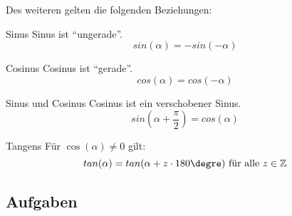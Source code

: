Des weiteren gelten die folgenden Beziehungen:
\begin{gesetz}{Sinus}{}
  Sinus ist ``ungerade''.
  $$sin(\alpha) = - sin(-\alpha)$$
  \end{gesetz}
\begin{gesetz}{Cosinus}{}
  Cosinus ist ``gerade''.
  $$cos(\alpha) = cos(-\alpha)$$
  \end{gesetz}
\begin{gesetz}{Sinus und Cosinus}{}
  Cosinus ist ein verschobener Sinus.
  $$sin\left(\alpha+\frac{\pi}{2}\right) = cos(\alpha)$$
  \end{gesetz}
\begin{gesetz}{Tangens}{}
  Für $\cos(\alpha)\ne 0$ gilt:
  $$tan(\alpha) = tan(\alpha + z\cdot{}180\degre) \textrm{ für alle } z\in\mathbb{Z}$$
  \end{gesetz}
\newpage



\subsection*{Aufgaben}

